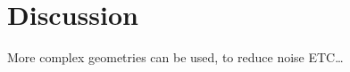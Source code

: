 \section{Discussion}
More complex geometries can be used, to reduce noise ETC\ldots \cite{burke_introduction_2013}